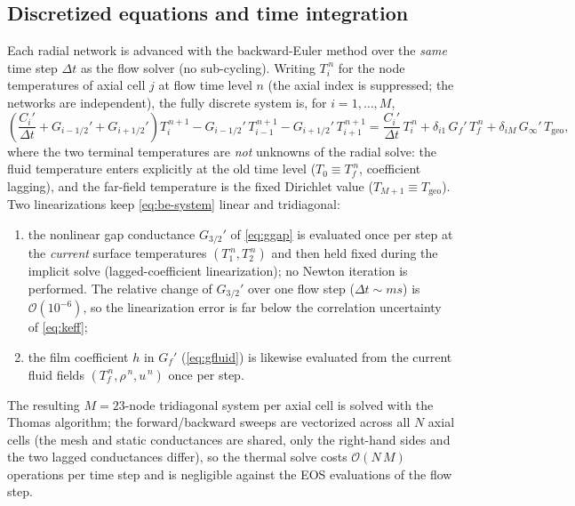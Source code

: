 \documentclass[11pt]{article}
\begin{document}
\subsection{Discretized equations and time integration}
\label{sec:thermal-discrete}

Each radial network is advanced with the backward-Euler method over
the \emph{same} time step $\Delta t$ as the flow solver (no
sub-cycling). Writing $T_i^{\,n}$ for the node temperatures of axial
cell $j$ at flow time level $n$ (the axial index is suppressed; the
networks are independent), the fully discrete system is, for
$i = 1, \dots, M$,
\begin{equation}
\left(\frac{C_i'}{\Delta t} + G_{i-1/2}' + G_{i+1/2}'\right)
T_i^{\,n+1}
 - G_{i-1/2}'\,T_{i-1}^{\,n+1}
 - G_{i+1/2}'\,T_{i+1}^{\,n+1}
 = \frac{C_i'}{\Delta t}\,T_i^{\,n}
 + \delta_{i1}\,G_f'\,T_f^{\,n}
 + \delta_{iM}\,G_\infty'\,T_{\mathrm{geo}},
\label{eq:be-system}
\end{equation}
where the two terminal temperatures are \emph{not} unknowns of the
radial solve: the fluid temperature enters explicitly at the old time
level ($T_0 \equiv T_f^{\,n}$, coefficient lagging), and the far-field
temperature is the fixed Dirichlet value ($T_{M+1} \equiv
T_{\mathrm{geo}}$). Two linearizations keep \cref{eq:be-system}
linear and tridiagonal:
\begin{enumerate}
\item the nonlinear gap conductance $G_{3/2}'$ of \cref{eq:ggap} is
evaluated once per step at the \emph{current} surface temperatures
$(T_1^{\,n}, T_2^{\,n})$ and then held fixed during the implicit
solve (lagged-coefficient linearization); no Newton iteration is
performed. The relative change of $G_{3/2}'$ over one flow step
($\Delta t \sim \si{ms}$) is $\mathcal{O}(10^{-6})$, so the
linearization error is far below the correlation uncertainty of
\cref{eq:keff};
\item the film coefficient $h$ in $G_f'$ (\cref{eq:gfluid}) is
likewise evaluated from the current fluid fields
$(T_f^{\,n}, \rho^{\,n}, u^{\,n})$ once per step.
\end{enumerate}
The resulting $M = 23$-node tridiagonal system per axial cell is
solved with the Thomas algorithm; the forward/backward sweeps are
vectorized across all $N$ axial cells (the mesh and static
conductances are shared, only the right-hand sides and the two lagged
conductances differ), so the thermal solve costs
$\mathcal{O}(N\,M)$ operations per time step and is negligible
against the EOS evaluations of the flow step.
\end{document}
